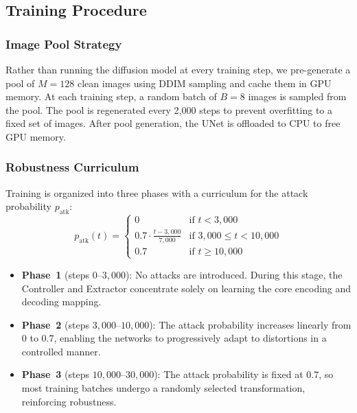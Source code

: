 \documentclass[conference]{IEEEtran}
\begin{document}
\subsection{Training Procedure}
\label{sec:training}

\subsubsection{Image Pool Strategy}
Rather than running the diffusion model at every training step, we pre-generate a pool of $M = 128$ clean images using DDIM sampling and cache them in GPU memory.
At each training step, a random batch of $B = 8$ images is sampled from the pool.
The pool is regenerated every 2{,}000 steps to prevent overfitting to a fixed set of images.
After pool generation, the UNet is offloaded to CPU to free GPU memory.

\subsubsection{Robustness Curriculum}
Training is organized into three phases with a curriculum for the attack probability $p_\text{atk}$:
\begin{equation}
    p_\text{atk}(t) = \begin{cases}
        0 & \text{if } t < 3{,}000 \\
        0.7 \cdot \frac{t - 3{,}000}{7{,}000} & \text{if } 3{,}000 \leq t < 10{,}000 \\
        0.7 & \text{if } t \geq 10{,}000
    \end{cases}
    \label{eq:curriculum}
\end{equation}

\begin{itemize}[itemsep=1pt, topsep=2pt]
    \item \textbf{Phase~1} (steps $0$--$3{,}000$): No attacks are introduced. During this stage, the Controller and Extractor concentrate solely on learning the core encoding and decoding mapping.
    \item \textbf{Phase~2} (steps $3{,}000$--$10{,}000$): The attack probability increases linearly from $0$ to $0.7$, enabling the networks to progressively adapt to distortions in a controlled manner.
    \item \textbf{Phase~3} (steps $10{,}000$--$30{,}000$): The attack probability is fixed at $0.7$, so most training batches undergo a randomly selected transformation, reinforcing robustness.
\end{itemize}
\end{document}
